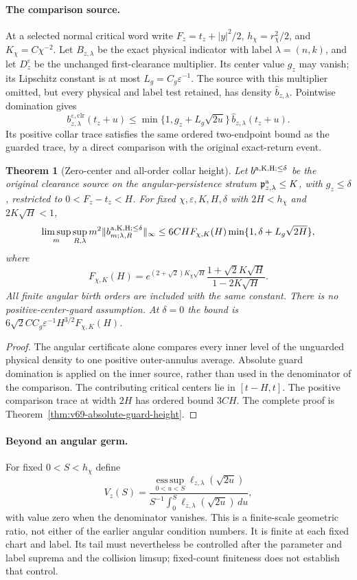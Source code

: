 \documentclass[11pt,reqno]{amsart}
\numberwithin{equation}{section}
\newtheorem{leadtheorem}{Theorem}
\theoremstyle{definition}\newtheorem{definition}[theorem]{Definition}
\theoremstyle{remark}\newtheorem{remark}[theorem]{Remark}
\begin{document}
\paragraph{The comparison source.}
At a selected normal critical word write $F_z=t_z+|y|^2/2$,
$h_\chi=r_\chi^2/2$, and $K_\chi=C\chi^{-2}$. Let
$B_{z,\lambda}$ be the exact physical indicator with label
$\lambda=(n,k)$, and let $D_z^\varepsilon$ be the unchanged
first-clearance multiplier. Its center value $g_z$ may vanish;
its Lipschitz constant is at most $L_g=C_g\varepsilon^{-1}$.
The source with this multiplier omitted, but every physical and
label test retained, has density $\widehat b_{z,\lambda}$.
Pointwise domination gives
\[
 b_{z,\lambda}^{\varepsilon,\mathrm{clr}}(t_z+u)
 \le\min\{1,g_z+L_g\sqrt{2u}\}\,
                       \widehat b_{z,\lambda}(t_z+u).
\]
Its positive collar trace satisfies the same ordered two-endpoint
bound as the guarded trace, by a direct comparison with the
original exact-return event.

\begin{leadtheorem}[Zero-center and all-order collar height]
\label{thm:intro-v69-zero-guard}
Let $b^{\rm a,K,H;\le\delta}$ be the original clearance source
on the angular-persistence stratum
$\mathfrak p^{\rm a}_{z,\lambda}\le K$, with $g_z\le\delta$,
restricted to $0<F_z-t_z<H$. For fixed
$\chi,\varepsilon,K,H,\delta$ with $2H<h_\chi$ and
$2K\sqrt H<1$,
\[
 \limsup_m\sup_{R,\lambda}m^2
       \|b^{\rm a,K,H;\le\delta}_{m;\lambda,R}\|_\infty
 \le6CH F_{\chi,K}(H)\min\{1,\delta+L_g\sqrt{2H}\},
\]
where
\[
 F_{\chi,K}(H)=e^{(2+\sqrt2)K_\chi\sqrt H}
                 \frac{1+\sqrt2K\sqrt H}{1-2K\sqrt H}.
\]
All finite angular birth orders are included with the same constant.
There is no positive-center-guard assumption. At $\delta=0$ the
bound is $6\sqrt2 C C_g\varepsilon^{-1}H^{3/2}F_{\chi,K}(H)$.
\end{leadtheorem}
\begin{proof}
The angular certificate alone compares every inner level of the
unguarded physical density to one positive outer-annulus average.
Absolute guard domination is applied on the inner source, rather
than used in the denominator of the comparison. The contributing
critical centers lie in $[t-H,t]$. The positive comparison trace at
width $2H$ has ordered bound $3CH$. The complete proof is
Theorem~\ref{thm:v69-absolute-guard-height}.
\end{proof}

\paragraph{Beyond an angular germ.}
For fixed $0<S<h_\chi$ define
\[
 V_z(S)=\frac{\operatorname*{ess\,sup}_{0<u<S}
                      \ell_{z,\lambda}(\sqrt{2u})}
                  {S^{-1}\int_0^S\ell_{z,\lambda}(\sqrt{2u})\,du},
\]
with value zero when the denominator vanishes. This is a finite-scale
geometric ratio, not either of the earlier angular condition numbers.
It is finite at each fixed chart and label. Its tail must nevertheless
be controlled after the parameter and label suprema and the collision
limsup; fixed-count finiteness does not establish that control.
\end{document}
